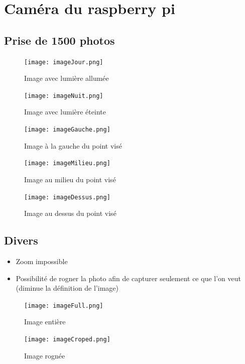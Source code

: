 \documentclass[12pt]{beamer}
\begin{document}
	\section{Caméra du raspberry pi}
	\subsection{Prise de 1500 photos}
	\begin{frame}[allowframebreaks]
	    \begin{figure}
		    \centering
		    \texttt{[image: imageJour.png]}
		    \caption*{Image avec lumière allumée}
		\end{figure}
		\begin{figure}
		    \centering
		    \texttt{[image: imageNuit.png]}
		    \caption*{Image avec lumière éteinte}
		\end{figure}
		
	    \begin{figure}
		    \centering
		    \texttt{[image: imageGauche.png]}
		    \caption*{Image à la gauche du point visé}
		\end{figure}
		\begin{figure}
		    \centering
		    \texttt{[image: imageMilieu.png]}
		    \caption*{Image au milieu du point visé}
		\end{figure}
		\begin{figure}
		    \centering
		    \texttt{[image: imageDessus.png]}
		    \caption*{Image au dessus du point visé}
		\end{figure}
	\end{frame}
	\subsection{Divers}
	\begin{frame}[allowframebreaks]
	    \begin{block}{}
	        \begin{itemize}
	            [triangle]
	            \item Zoom impossible 
	            \item Possibilité de rogner la photo afin de capturer seulement ce que l'on veut (diminue la définition de l'image)
	        \end{itemize}
	    \end{block}
	    
	    \begin{figure}
		    \centering
		    \texttt{[image: imageFull.png]}
		    \caption*{Image entière}
		\end{figure}
		
		\begin{figure}
		    \centering
		    \texttt{[image: imageCroped.png]}
		    \caption*{Image rognée}
		\end{figure}
	\end{frame}
\end{document}
